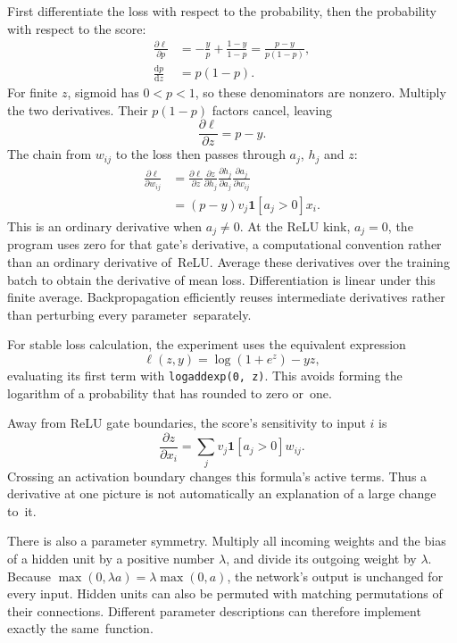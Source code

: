 First differentiate the loss with respect to the probability, then the probability with respect to the score:
\[
\begin{aligned}
\frac{\partial\ell}{\partial p}
 &=-\frac{y}{p}+\frac{1-y}{1-p}
 =\frac{p-y}{p(1-p)},\\
\frac{\mathrm dp}{\mathrm dz}&=p(1-p).
\end{aligned}
\]
For finite $z$, sigmoid has $0<p<1$, so these denominators are nonzero. Multiply the two derivatives. Their $p(1-p)$ factors cancel, leaving
\[
\frac{\partial\ell}{\partial z}=p-y.
\]
The chain from $w_{ij}$ to the loss then passes through $a_j$, $h_j$ and $z$:
\[
\begin{aligned}
\frac{\partial\ell}{\partial w_{ij}}&=
\frac{\partial\ell}{\partial z}
\frac{\partial z}{\partial h_j}
\frac{\partial h_j}{\partial a_j}
\frac{\partial a_j}{\partial w_{ij}}
\\&=(p-y)v_j\mathbf{1}[a_j>0]x_i.
\end{aligned}
\]
This is an ordinary derivative when $a_j\ne0$. At the ReLU kink, $a_j=0$, the program uses zero for that gate's derivative, a computational convention rather than an ordinary derivative of~ReLU.
Average these derivatives over the training batch to obtain the derivative of mean loss. Differentiation is linear under this finite average. Backpropagation efficiently reuses intermediate derivatives rather than perturbing every parameter~separately.

For stable loss calculation, the experiment uses the equivalent expression
\[
\ell(z,y)=\log(1+e^z)-yz,
\]
evaluating its first term with \texttt{logaddexp(0, z)}. This avoids forming the logarithm of a probability that has rounded to zero or~one.

\label{note:v31-positive-rescaling}

Away from ReLU gate boundaries, the score's sensitivity to input $i$ is
\[
\frac{\partial z}{\partial x_i}
=\sum_j v_j\mathbf{1}[a_j>0]w_{ij}.
\]
Crossing an activation boundary changes this formula's active terms. Thus a derivative at one picture is not automatically an explanation of a large change to~it.

There is also a parameter symmetry. Multiply all incoming weights and the bias of a hidden unit by a positive number $\lambda$, and divide its outgoing weight by $\lambda$. Because $\max(0,\lambda a)=\lambda\max(0,a)$, the network's output is unchanged for every input. Hidden units can also be permuted with matching permutations of their connections. Different parameter descriptions can therefore implement exactly the same~function.


